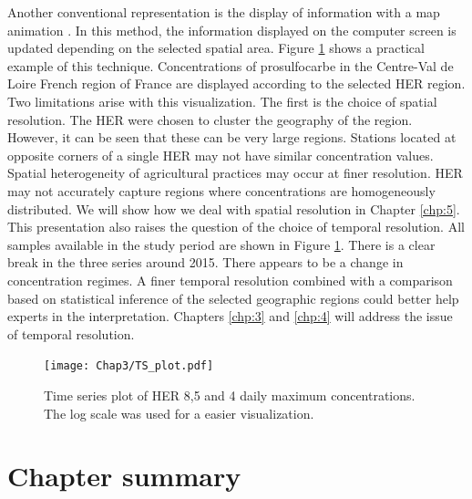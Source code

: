 Another conventional representation is the display of information with a map animation \cite{Andrienko2003}. In this method, the information displayed on the computer screen is updated depending on the selected spatial area. Figure \ref{fig:tsplot_ex} shows a practical example of this technique. Concentrations of prosulfocarbe in the Centre-Val de Loire French region of France are displayed according to the selected HER region. Two limitations arise with this visualization. The first is the choice of spatial resolution. The HER were chosen to cluster the geography of the region. However, it can be seen that these can be very large regions. Stations located at opposite corners of a single HER may not have similar concentration values. Spatial heterogeneity of agricultural practices may occur at finer resolution. HER may not accurately capture regions where concentrations are homogeneously distributed. We will show how we deal with spatial resolution in Chapter \ref{chp:5}. This presentation also raises the question of the choice of temporal resolution. All samples available in the study period are shown in Figure \ref{fig:tsplot_ex}. There is a clear break in the three series around 2015. There appears to be a change in concentration regimes. A finer temporal resolution combined with a comparison based on statistical inference of the selected geographic regions could better help experts in the interpretation. Chapters \ref{chp:3} and \ref{chp:4} will address the issue of temporal resolution.

\begin{figure}[ht]
    \centering
    \texttt{[image: Chap3/TS\_plot.pdf]}
    \caption{Time series plot of HER 8,5 and 4 daily maximum concentrations. The log scale was used for a easier visualization.}
    \label{fig:tsplot_ex}
\end{figure}

\clearpage

\section{Chapter summary}

